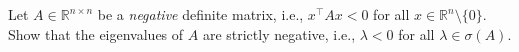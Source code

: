 Let $A \in \mathbb{R}^{n \times n}$ be a \textit{negative} definite matrix, i.e., $x^\top A x < 0$ for all $x \in \mathbb{R}^{n}\setminus \{0\}$. Show that the eigenvalues of $A$ are strictly negative, i.e., $\lambda < 0 $ for all $\lambda \in \sigma(A)$.

